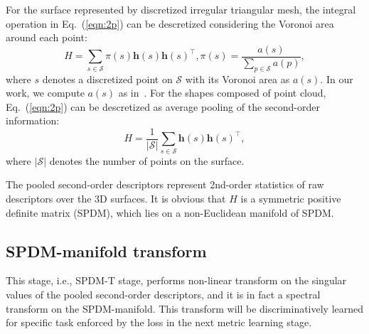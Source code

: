 \documentclass[runningheads]{llncs}
\begin{document}
For the surface represented by discretized irregular triangular mesh, the integral operation in Eq.~(\ref{eqn:2p}) can be descretized considering the Voronoi area around each point:
\begin{equation}
H = \sum_{s \in{\mathcal{S}}}\pi(s)\mathbf{h}(s) \mathbf{h}(s)^\top, \pi(s) = \frac{a(s)}{\sum_{p\in{\mathcal{S}}}a(p)},
\label{eqn:2p0}
\end{equation}
where $s$ denotes a discretized point on ${\mathcal{S}}$ with its Voronoi area as $a(s)$. In our work, we compute $a(s)$ as in~\cite{Mathieu}.
For the shapes composed of point cloud, Eq.~(\ref{eqn:2p}) can be descretized as average pooling of the second-order information:
\begin{equation}
H = \frac{1}{|\mathcal{S} |} \sum_{s \in{\mathcal{S}}}\mathbf{h}(s) \mathbf{h}(s)^\top,
\label{eqn:2pd}
\end{equation}
where $|\mathcal{S}|$ denotes the number of points on the surface.


The pooled second-order descriptors represent 2nd-order statistics of raw descriptors over the 3D surfaces.  It is obvious that $H$ is a symmetric positive definite matrix (SPDM), which lies on a non-Euclidean manifold of SPDM.%


\subsection{SPDM-manifold transform}
This stage, i.e., SPDM-T stage, performs non-linear transform on the singular values of the pooled second-order descriptors, and it is in fact a spectral transform on the SPDM-manifold. This transform will be discriminatively learned for specific task enforced by the loss in the next metric learning stage. 
\end{document}
